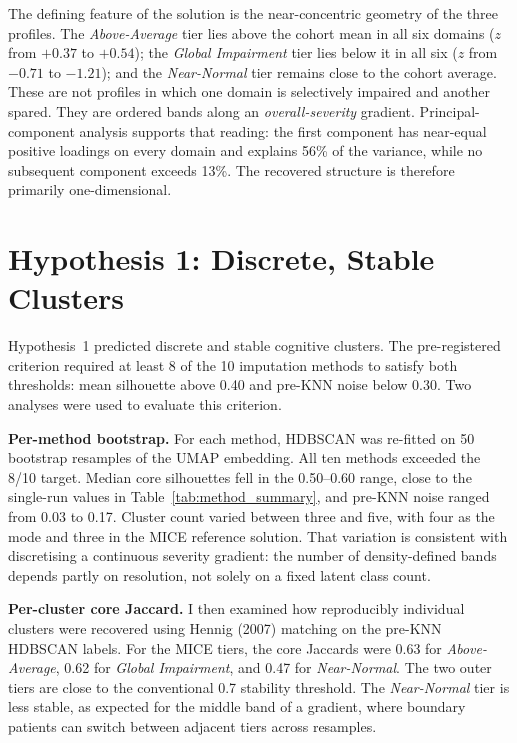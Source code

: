 The defining feature of the solution is the near-concentric geometry of the three profiles. The \emph{Above-Average} tier lies above the cohort mean in all six domains ($z$ from $+0.37$ to $+0.54$); the \emph{Global Impairment} tier lies below it in all six ($z$ from $-0.71$ to $-1.21$); and the \emph{Near-Normal} tier remains close to the cohort average. These are not profiles in which one domain is selectively impaired and another spared. They are ordered bands along an \emph{overall-severity} gradient. Principal-component analysis supports that reading: the first component has near-equal positive loadings on every domain and explains 56\% of the variance, while no subsequent component exceeds 13\%. The recovered structure is therefore primarily one-dimensional.


\section{Hypothesis 1: Discrete, Stable Clusters}\label{sec:h1_results}

Hypothesis~1 predicted discrete and stable cognitive clusters. The pre-registered criterion required at least 8 of the 10 imputation methods to satisfy both thresholds: mean silhouette above 0.40 and pre-KNN noise below 0.30. Two analyses were used to evaluate this criterion.

\textbf{Per-method bootstrap.} For each method, HDBSCAN was re-fitted on 50 bootstrap resamples of the UMAP embedding. All ten methods exceeded the 8/10 target. Median core silhouettes fell in the 0.50--0.60 range, close to the single-run values in Table~\ref{tab:method_summary}, and pre-KNN noise ranged from 0.03 to 0.17. Cluster count varied between three and five, with four as the mode and three in the MICE reference solution. That variation is consistent with discretising a continuous severity gradient: the number of density-defined bands depends partly on resolution, not solely on a fixed latent class count.

\textbf{Per-cluster core Jaccard.} I then examined how reproducibly individual clusters were recovered using Hennig (2007) matching on the pre-KNN HDBSCAN labels. For the MICE tiers, the core Jaccards were 0.63 for \emph{Above-Average}, 0.62 for \emph{Global Impairment}, and 0.47 for \emph{Near-Normal}. The two outer tiers are close to the conventional 0.7 stability threshold. The \emph{Near-Normal} tier is less stable, as expected for the middle band of a gradient, where boundary patients can switch between adjacent tiers across resamples.

